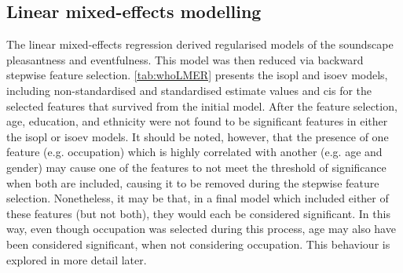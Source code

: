 \subsection{Linear mixed-effects modelling}
\label{sec:whoLMERinit}
The linear mixed-effects regression derived regularised models of the soundscape pleasantness and eventfulness. This model was then reduced via backward stepwise feature selection. \cref{tab:whoLMER} presents the \gls{isopl} and \gls{isoev} models, including non-standardised and standardised estimate values and \glspl{ci} for the selected features that survived from the initial model. After the feature selection, age, education, and ethnicity were not found to be significant features in either the \gls{isopl} or \gls{isoev} models. It should be noted, however, that the presence of one feature (e.g. occupation) which is highly correlated with another (e.g. age and gender) may cause one of the features to not meet the threshold of significance when both are included, causing it to be removed during the stepwise feature selection. Nonetheless, it may be that, in a final model which included either of these features (but not both), they would each be considered significant. In this way, even though occupation was selected during this process, age may also have been considered significant, when not considering occupation. This behaviour is explored in more detail later.

